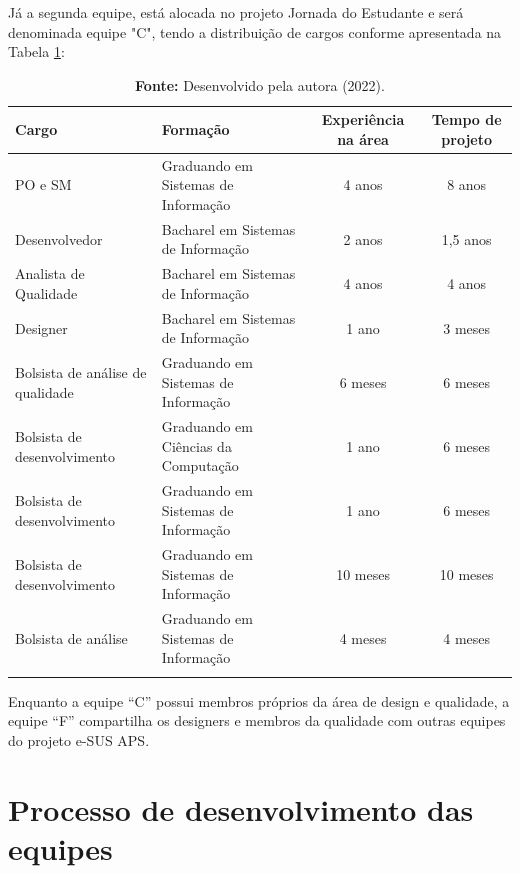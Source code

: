\documentclass[
    12pt,       %
    openright,      %
    twoside,      %
    a4paper,      %
    english,      %
    french,       %
    spanish,      %
    brazil,       %
    ]{abntex2}
\begin{document}
Já a segunda equipe, está alocada no projeto Jornada do Estudante e será denominada equipe "C", tendo a distribuição de cargos conforme apresentada na Tabela \ref{tab:EquipeC}:

\begin{longtable}{|p{4cm}|p{4cm}|c|c|}
    \caption{Membros da equipe C}
    \label{tab:EquipeC}
    \centering
            \centering
            \hline \rowcolor{lightgray}
            \textbf{Cargo} & \textbf{Formação} & \textbf{Experiência na área} & \textbf{Tempo de projeto} 
            \\ \hline 
            PO e SM & Graduando em Sistemas de Informação & 4 anos & 8 anos 
            \\ \hline
            Desenvolvedor & Bacharel em Sistemas de Informação & 2 anos & 1,5 anos 
            \\ \hline 
            Analista de Qualidade & Bacharel em Sistemas de Informação & 4 anos & 4 anos 
            \\ \hline 
            Designer & Bacharel em Sistemas de Informação & 1 ano & 3 meses 
            \\ \hline
            Bolsista de análise de qualidade & Graduando em Sistemas de Informação & 6 meses & 6 meses 
            \\ \hline 
            Bolsista de desenvolvimento & Graduando em Ciências da Computação & 1 ano & 6 meses 
            \\ \hline 
            Bolsista de desenvolvimento & Graduando em Sistemas de Informação & 1 ano & 6 meses 
            \\ \hline             
            Bolsista de desenvolvimento & Graduando em Sistemas de Informação & 10 meses & 10 meses 
            \\ \hline             
            Bolsista de análise & Graduando em Sistemas de Informação & 4 meses & 4 meses 
            \\ \hline 
            \addlinespace[0.2cm]
            \caption*{\textbf{Fonte:} Desenvolvido pela autora (2022).}
\end{longtable}

Enquanto a equipe ``C'' possui membros próprios da área de design e qualidade, a equipe ``F'' compartilha os designers e membros da qualidade com outras equipes do projeto e-SUS APS. 

\section{Processo de desenvolvimento das equipes}
\end{document}
